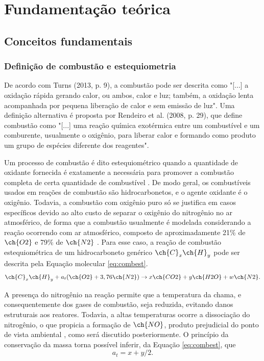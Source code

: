 \chapter{Fundamentação teórica}

\section{Conceitos fundamentais}

\subsection{Definição de combustão e estequiometria}
De acordo com Turns (2013, p. 9), a combustão pode ser descrita como "[...] a oxidação rápida gerando calor, ou ambos, calor e luz; também, a oxidação lenta acompanhada por pequena liberação de calor e sem emissão de luz". Uma definição alternativa é proposta por Rendeiro et al. (2008, p. 29), que define combustão como "[...] uma reação química exotérmica entre um combustível e um comburente, usualmente o oxigênio, para liberar calor e formando como produto um grupo de espécies diferente dos reagentes". 

Um processo de combustão é dito estequiométrico quando a quantidade de oxidante fornecida é exatamente a necessária para promover a combustão completa de certa quantidade de combustível \cite{Turns}. De modo geral, os combustíveis usados em reações de combustão são hidrocarbonetos, e o agente oxidante é o oxigênio. Todavia, a combustão com oxigênio puro só se justifica em casos específicos devido ao alto custo de separar o oxigênio do nitrogênio no ar atmosférico, de forma que a combustão usualmente é modelada considerando a reação ocorrendo com ar atmosférico, composto de aproximadamente 21\% de $\ch{O2}$ e 79\% de $\ch{N2}$ \cite{Amazonia}. Para esse caso, a reação de combustão estequiométrica de um hidrocarboneto genérico $\ch{C}_x \ch{H}_y$ pode ser descrita pela Equação molecular \eqref{eq:combest}.
\begin{equation} \label{eq:combest}
\ch{C}_x \ch{H}_y + a_t(\ch{O2} + 3,76 \ch{N2}) \rightarrow{} x \ch{CO2} + y \ch{H2O} + w \ch{N2}.
\end{equation}

A presença do nitrogênio na reação permite que a temperatura da chama, e consequentemente dos gases de combustão, seja reduzida, evitando danos estruturais aos reatores. Todavia, a altas temperaturas ocorre a dissociação do nitrogênio, o que propicia a formação de $\ch{NO}$, produto prejudicial do ponto de vista ambiental \cite{Amazonia}, como será discutido posteriormente. O princípio da conservação da massa torna possível inferir, da Equação \eqref{eq:combest}, que
\begin{equation}
a_t = x + y/2.
\end{equation}

